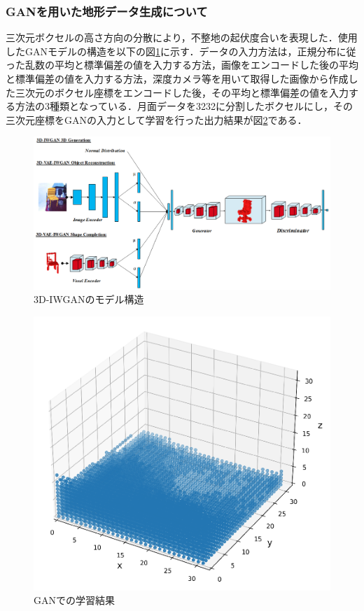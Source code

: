 \subsubsection{GANを用いた地形データ生成について}
三次元ボクセルの高さ方向の分散により，不整地の起伏度合いを表現した．使用したGANモデルの構造を以下の図\ref{fig:3d_gan}に示す．データの入力方法は，正規分布に従った乱数の平均と標準偏差の値を入力する方法，画像をエンコードした後の平均と標準偏差の値を入力する方法，深度カメラ等を用いて取得した画像から作成した三次元のボクセル座標をエンコードした後，その平均と標準偏差の値を入力する方法の3種類となっている．月面データを32\times32に分割したボクセルにし，その三次元座標をGANの入力として学習を行った出力結果が図\ref{fig:voxel}である．

\begin{figure}[htbp]
    \begin{center}
     \includegraphics[width=1.0\linewidth]{images/3d_gan.png}
     \caption{3D-IWGANのモデル構造}
     \label{fig:3d_gan}
    \end{center}
\end{figure}

\begin{figure}[htbp]
    \begin{center}
     \includegraphics[width=0.6\linewidth]{images/voxel.png}
     \caption{GANでの学習結果}
     \label{fig:voxel}
    \end{center}
\end{figure}

